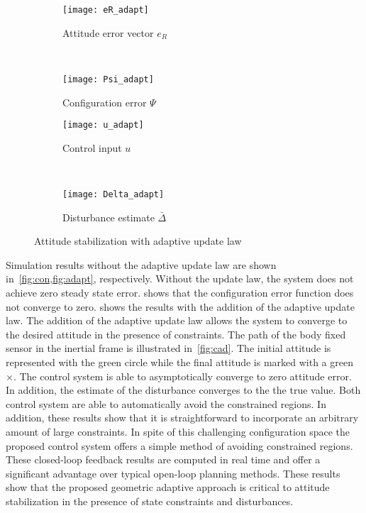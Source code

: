 \documentclass[letterpaper, 10 pt, conference]{ieeeconf}  %
\begin{document}
\begin{figure} 
	\centering 
	\begin{subfigure}[htbp]{0.5\columnwidth} 
		\texttt{[image: eR\_adapt]} 
		\caption{Attitude error vector \(e_R\) } \label{fig:eR_adapt} 
	\end{subfigure}~ %
	\begin{subfigure}[htbp]{0.5\columnwidth} 
		\texttt{[image: Psi\_adapt]} 
		\caption{Configuration error \( \Psi \)} \label{fig:Psi_adapt} 
	\end{subfigure}
	
	\begin{subfigure}[htbp]{0.5\columnwidth} 
		\texttt{[image: u\_adapt]} 
		\caption{Control input \( u\)} \label{fig:u_adapt} 
	\end{subfigure}~	
	\begin{subfigure}[htbp]{0.5\columnwidth} 
		\texttt{[image: Delta\_adapt]} 
		\caption{Disturbance estimate \( \bar{\Delta}\)} \label{fig:Delta_adapt} 
	\end{subfigure}
	\caption{Attitude stabilization with adaptive update law}
	\label{fig:adapt} 
\end{figure}

Simulation results without the adaptive update law are shown in~\cref{fig:con,fig:adapt}, respectively.
Without the update law, the system does not achieve zero steady state error. 
 shows that the configuration error function does not converge to zero.
 shows the results with the addition of the adaptive update law.
The addition of the adaptive update law allows the system to converge to the desired attitude in the presence of constraints.
The path of the body fixed sensor in the inertial frame is illustrated in~\cref{fig:cad}.
The initial attitude is represented with the green circle while the final attitude is marked with a green \(\times\).
The control system is able to asymptotically converge to zero attitude error.
In addition, the estimate of the disturbance converges to the the true value.
Both control system are able to automatically avoid the constrained regions. 
In addition, these results show that it is straightforward to incorporate an arbitrary amount of large constraints.
In spite of this challenging configuration space the proposed control system offers a simple method of avoiding constrained regions.
These closed-loop feedback results are computed in real time and offer a significant advantage over typical open-loop planning methods.
These results show that the proposed geometric adaptive approach is critical to attitude stabilization in the presence of state constraints and disturbances.
\end{document}
